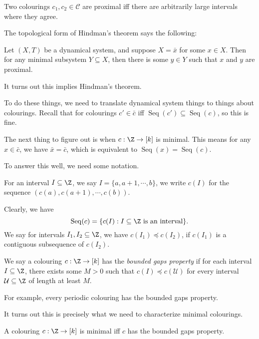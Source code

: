 \documentclass[a4paper]{article}
\DeclareMathOperator\Seq{Seq}
\begin{document}
\begin{eg}
  Two colourings $c_1, c_2 \in \mathcal{C}$ are proximal iff there are arbitrarily large intervals where they agree.
\end{eg}

The topological form of Hindman's theorem says the following:
\begin{thm}
  Let $(X, T)$ be a dynamical system, and suppose $X = \bar{x}$ for some $x \in X$. Then for any minimal subsystem $Y \subseteq X$, then there is some $y \in Y$ such that $x$ and $y$ are proximal.
\end{thm}
It turns out this implies Hindman's theorem.

To do these things, we need to translate dynamical system things to things about colourings. Recall that for colourings $c' \in \bar{c}$ iff $\Seq(c') \subseteq \Seq(c)$, so this is fine.

The next thing to figure out is when $c: \Z \to [k]$ is minimal. This means for any $x \in \bar{c}$, we have $\bar{x} = \bar{c}$, which is equivalent to $\Seq(x) = \Seq(c)$.

To answer this well, we need some notation.
\begin{notation}
  For an interval $I \subseteq \Z$, we say $I = \{a, a + 1, \cdots, b\}$, we write $c(I)$ for the sequence $(c(a), c(a + 1), \cdots, c(b))$.
\end{notation}
Clearly, we have
\[
  \Seq(c) = \{c(I): I \subseteq \Z\text{ is an interval}\}.
\]
We say for intervals $I_1, I_2 \subseteq \Z$, we have $c(I_1) \preccurlyeq c(I_2)$, if $c(I_1)$ is a contiguous subsequence of $c(I_2)$. %

\begin{defi}
  We say a colouring $c: \Z \to [k]$ has the \emph{bounded gaps property} if for each interval $I \subseteq \Z$, there exists some $M > 0$ such that $c(I) \preccurlyeq c(\mathcal{U})$ for every interval $\mathcal{U} \subseteq \Z$ of length at least $M$.
\end{defi}
For example, every periodic colouring has the bounded gaps property.

It turns out this is precisely what we need to characterize minimal colourings.

\begin{prop}
  A colouring $c: \Z \to [k]$ is minimal iff $c$ has the bounded gaps property.
\end{prop}
\end{document}
